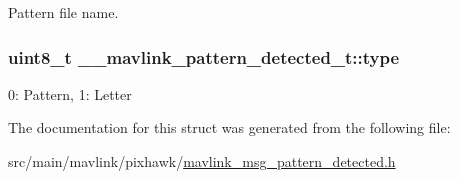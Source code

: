 Pattern file name. 

\hypertarget{struct____mavlink__pattern__detected__t_abb86b1f357c9d13fea4bbb680297bd64}{
\subsubsection[{type}]{\setlength{\rightskip}{0pt plus 5cm}uint8\+\_\+t \+\_\+\+\_\+mavlink\+\_\+pattern\+\_\+detected\+\_\+t\+::type}}\label{struct____mavlink__pattern__detected__t_abb86b1f357c9d13fea4bbb680297bd64}


0\+: Pattern, 1\+: Letter 



The documentation for this struct was generated from the following file\+:\begin{DoxyCompactItemize}
\item 
src/main/mavlink/pixhawk/\hyperlink{mavlink__msg__pattern__detected_8h}{mavlink\+\_\+msg\+\_\+pattern\+\_\+detected.\+h}\end{DoxyCompactItemize}
